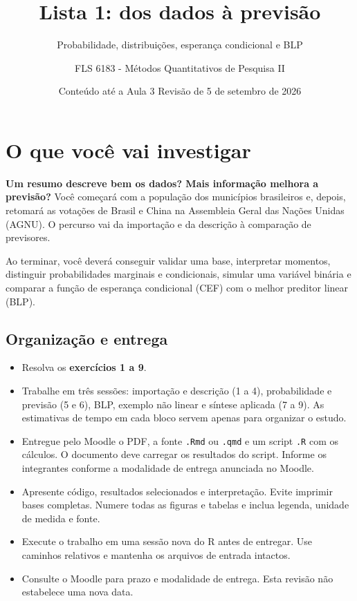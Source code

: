 \documentclass[
  brazilian,
  11pt,
  a4paper]{article}
\title{Lista 1: dos dados à previsão}
\subtitle{Probabilidade, distribuições, esperança condicional e BLP}
\author{FLS 6183 - Métodos Quantitativos de Pesquisa II}
\date{Conteúdo até a Aula 3 \textbar{} Revisão de 5 de setembro de 2026}
\providecommand{\tightlist}{%
  \setlength{\itemsep}{0pt}\setlength{\parskip}{0pt}}
\begin{document}
\maketitle

\section{O que você vai investigar}\label{o-que-vocuxea-vai-investigar}

\textbf{Um resumo descreve bem os dados? Mais informação melhora a
previsão?} Você começará com a população dos municípios brasileiros e,
depois, retomará as votações de Brasil e China na Assembleia Geral das
Nações Unidas (AGNU). O percurso vai da importação e da descrição à
comparação de previsores.

Ao terminar, você deverá conseguir validar uma base, interpretar
momentos, distinguir probabilidades marginais e condicionais, simular
uma variável binária e comparar a função de esperança condicional (CEF)
com o melhor preditor linear (BLP).

\subsection{Organização e entrega}\label{organizauxe7uxe3o-e-entrega}

\begin{itemize}
\tightlist
\item
  Resolva os \textbf{exercícios 1 a 9}.
\item
  Trabalhe em três sessões: importação e descrição (1 a 4),
  probabilidade e previsão (5 e 6), BLP, exemplo não linear e síntese
  aplicada (7 a 9). As estimativas de tempo em cada bloco servem apenas
  para organizar o estudo.
\item
  Entregue pelo Moodle o PDF, a fonte \texttt{.Rmd} ou \texttt{.qmd} e
  um script \texttt{.R} com os cálculos. O documento deve carregar os
  resultados do script. Informe os integrantes conforme a modalidade de
  entrega anunciada no Moodle.
\item
  Apresente código, resultados selecionados e interpretação. Evite
  imprimir bases completas. Numere todas as figuras e tabelas e inclua
  legenda, unidade de medida e fonte.
\item
  Execute o trabalho em uma sessão nova do R antes de entregar. Use
  caminhos relativos e mantenha os arquivos de entrada intactos.
\item
  Consulte o Moodle para prazo e modalidade de entrega. Esta revisão não
  estabelece uma nova data.
\end{itemize}
\end{document}
